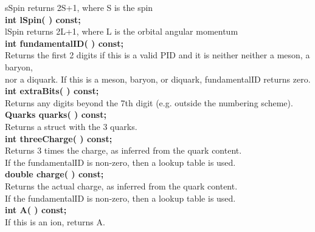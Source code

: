 \begin{tabbing}
\hspace{1.0in}  sSpin returns 2S+1, where S is the spin \\
\hspace{0.5in}  {\bf int  lSpin( )        const; }\\
\hspace{1.0in}  lSpin returns 2L+1, where L is the orbital angular momentum \\
\hspace{0.5in}  {\bf int fundamentalID( ) const; }\\
\hspace{1.0in}  Returns the first 2 digits if this is a valid PID and it is neither
                neither a meson, a baryon, \\
\hspace{1.0in}	nor a diquark.  If this is a meson, baryon, or
		diquark, fundamentalID returns zero. \\
\hspace{0.5in}  {\bf int extraBits( ) const; }\\
\hspace{1.0in}  Returns any digits beyond the 7th digit 
                (e.g. outside the numbering scheme). \\
\hspace{0.5in}  {\bf Quarks quarks( ) const; }\\
\hspace{1.0in}  Returns a struct with the 3 quarks. \\
\hspace{0.5in}  {\bf int threeCharge( ) const; }\\
\hspace{1.0in}  Returns 3 times the charge, as inferred from the quark content.\\
\hspace{1.0in}  If the fundamentalID is non-zero, then a lookup table is used. \\
\hspace{0.5in}  {\bf double charge( ) const; }\\
\hspace{1.0in}  Returns the actual charge, as inferred from the quark content.\\
\hspace{1.0in}  If the fundamentalID is non-zero, then a lookup table is used. \\
\hspace{0.5in}  {\bf int A( ) const; }\\
\hspace{1.0in}  If this is an ion, returns A.\\

\end{tabbing}
